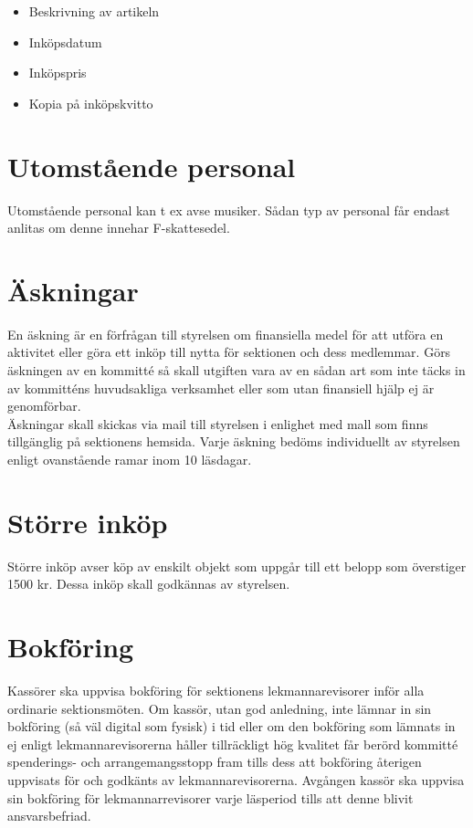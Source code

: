 \documentclass[11pt, includeaddress]{classes/cthit}
\begin{document}
\begin{itemize}
	\item Beskrivning av artikeln
	\item Inköpsdatum
	\item Inköpspris
	\item Kopia på inköpskvitto
\end{itemize}


\section{Utomstående personal}
Utomstående personal kan t ex avse musiker. Sådan typ av personal får endast anlitas om denne innehar F-skattesedel.

\section{Äskningar}
En äskning är en förfrågan till styrelsen om finansiella medel för att utföra en aktivitet eller göra ett inköp till nytta för sektionen och dess medlemmar. Görs äskningen av en kommitté så skall utgiften vara av en sådan art som inte täcks in av kommitténs huvudsakliga verksamhet eller som utan finansiell hjälp ej är genomförbar. \\

Äskningar skall skickas via mail till styrelsen i enlighet med mall som finns tillgänglig på sektionens hemsida. Varje äskning bedöms individuellt av styrelsen enligt ovanstående ramar inom 10 läsdagar.

\section{Större inköp}
Större inköp avser köp av enskilt objekt som uppgår till ett belopp som överstiger 1500 kr. Dessa inköp skall godkännas av styrelsen.

\section{Bokföring}
Kassörer ska uppvisa bokföring för sektionens lekmannarevisorer inför alla ordinarie sektionsmöten. 
Om kassör, utan god anledning, inte lämnar in sin bokföring (så väl digital som fysisk) i tid eller om den bokföring som lämnats in ej enligt lekmannarevisorerna håller tillräckligt hög kvalitet får berörd kommitté spenderings- och arrangemangsstopp fram tills dess att bokföring återigen uppvisats för och godkänts av lekmannarevisorerna.
Avgången kassör ska uppvisa sin bokföring för lekmannarrevisorer varje läsperiod tills att denne blivit ansvarsbefriad.
\end{document}
